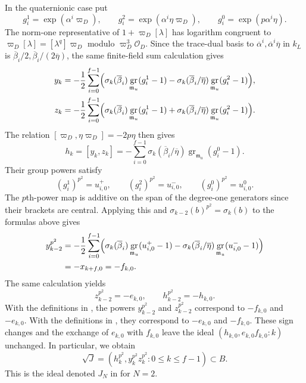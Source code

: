 \documentclass[11pt]{article}
\numberwithin{equation}{section}
\theoremstyle{definition}
\theoremstyle{remark}
\newcommand{\cO}{\mathcal O}
\DeclareMathOperator{\gr}{gr}
\begin{document}
In the quaternionic case put
\[
 g_i^1=\exp(\alpha^i\varpi_D),\qquad
 g_i^2=\exp(\alpha^i\eta\varpi_D),\qquad
 g_i^0=\exp(p\alpha^i\eta).
\]
The norm-one representative of $1+\varpi_D[\lambda]$
has logarithm congruent to
$\varpi_D[\lambda]=[\lambda^q]\varpi_D$ modulo
$\varpi_D^3\cO_D$. Since the trace-dual basis to
$\overline\alpha^i,\overline\alpha^i\overline\eta$ in $k_L$
is $\overline\beta_i/2,\overline\beta_i/(2\overline\eta)$,
the same finite-field sum calculation gives
\[
 \begin{aligned}
 y_k&=-\frac12\sum_{i=0}^{f-1}\Bigl(
       \sigma_k(\overline\beta_i)\gr_{\mathfrak m_u}(g_i^1-1)
       -\sigma_k(\overline\beta_i/\overline\eta)
                                  \gr_{\mathfrak m_u}(g_i^2-1)\Bigr),\\
 z_k&=-\frac12\sum_{i=0}^{f-1}\Bigl(
       \sigma_k(\overline\beta_i)\gr_{\mathfrak m_u}(g_i^1-1)
       +\sigma_k(\overline\beta_i/\overline\eta)
                                  \gr_{\mathfrak m_u}(g_i^2-1)\Bigr).
 \end{aligned}
\]
The relation $[\varpi_D,\eta\varpi_D]=-2p\eta$ then gives
\[
 h_k=[y_k,z_k]
     =-\sum_{i=0}^{f-1}\sigma_k(\overline\beta_i/\overline\eta)
                                      \gr_{\mathfrak m_u}(g_i^0-1).
\]
Their group powers satisfy
\[
 (g_i^1)^{p^2}=u^+_{i,0},\qquad
 (g_i^2)^{p^2}=u^-_{i,0},\qquad
 (g_i^0)^{p^2}=u^0_{i,0}.
\]
The $p$th-power map is
additive on the span of the degree-one generators since their
brackets are central. Applying this and
$\sigma_{k-2}(b)^{p^2}=\sigma_k(b)$ to the formulas above gives
\[
 \begin{aligned}
 y_{k-2}^{p^2}
 &=-\frac12\sum_{i=0}^{f-1}\Bigl(
       \sigma_k(\overline\beta_i)\gr_{\mathfrak m_u}(u^+_{i,0}-1)
       -\sigma_k(\overline\beta_i/\overline\eta)
                                  \gr_{\mathfrak m_u}(u^-_{i,0}-1)\Bigr)\\
 &=-x_{k+f,0}=-f_{k,0}.
 \end{aligned}
\]
The same calculation yields
\[
 z_{k-2}^{p^2}=-e_{k,0},\qquad h_{k-2}^{p^2}=-h_{k,0}.
\]
With the definitions in \cite[\S~2.3]{HW24}, the powers
$y_{k-2}^{p^2}$ and $z_{k-2}^{p^2}$ correspond to $-f_{k,0}$ and
$-e_{k,0}$. With the definitions in \cite[(3.1), (3.17)]{BHH25},
they correspond to $-e_{k,0}$ and $-f_{k,0}$.
These sign changes and the exchange of $e_{k,0}$ with $f_{k,0}$
leave the ideal $(h_{k,0},e_{k,0}f_{k,0}:k)$ unchanged.
In particular, we obtain
\[
 \sqrt J=(h_k^{p^2},y_k^{p^2}z_k^{p^2}:0\leq k\leq f-1)
                         \subset B.
\]
This is the ideal denoted $J_N$ in \cite[\S~5]{Sor26a} for $N=2$.
\end{document}
